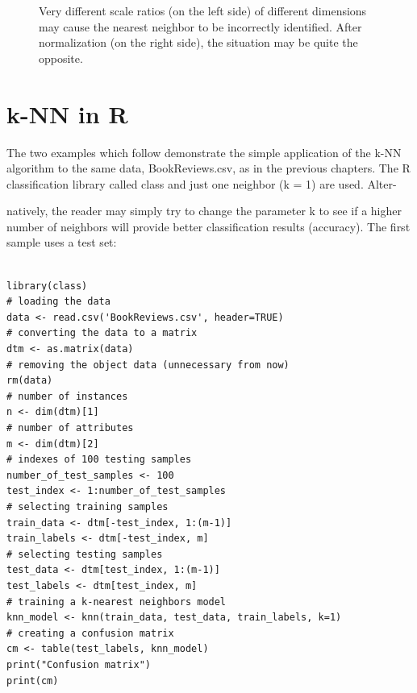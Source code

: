 \documentclass[11pt,openany,executivepaper]{book}
\begin{document}
\begin{figure}[h!]
    \caption{Very different scale ratios (on the left side) of different dimensions may cause 
        the nearest neighbor to be incorrectly identified. After normalization (on the right side), the 
        situation may be quite the opposite.}
    \label{fig:normalization}
\end{figure}
\section{k-NN in R}

The two examples which follow demonstrate the simple application of the k-NN
algorithm to the same data, BookReviews.csv, as in the previous chapters. The R
classification library called class and just one neighbor (k = 1) are used. Alter-

natively, the reader may simply try to change the parameter k to see if a higher
number of neighbors will provide better classification results (accuracy). The first
sample uses a test set:

\begin{verbatim}

library(class)
# loading the data
data <- read.csv('BookReviews.csv', header=TRUE)
# converting the data to a matrix
dtm <- as.matrix(data)
# removing the object data (unnecessary from now)
rm(data)
# number of instances
n <- dim(dtm)[1]
# number of attributes
m <- dim(dtm)[2]
# indexes of 100 testing samples
number_of_test_samples <- 100
test_index <- 1:number_of_test_samples
# selecting training samples
train_data <- dtm[-test_index, 1:(m-1)]
train_labels <- dtm[-test_index, m]
# selecting testing samples
test_data <- dtm[test_index, 1:(m-1)]
test_labels <- dtm[test_index, m]
# training a k-nearest neighbors model
knn_model <- knn(train_data, test_data, train_labels, k=1)
# creating a confusion matrix
cm <- table(test_labels, knn_model)
print("Confusion matrix")
print(cm)
\end{verbatim}
\end{document}
